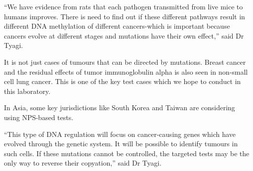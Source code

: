 \documentclass{article}
\begin{document}
“We have evidence from rats that each pathogen transmitted from live mice to humans improves. There is need to find out if these different pathways result in different DNA methylation of different cancers-which is important because cancers evolve at different stages and mutations have their own effect,” said Dr Tyagi.

It is not just cases of tumours that can be directed by mutations. Breast cancer and the residual effects of tumor immunoglobulin alpha is also seen in non-small cell lung cancer. This is one of the key test cases which we hope to conduct in this laboratory.

In Asia, some key jurisdictions like South Korea and Taiwan are considering using NPS-based tests.

“This type of DNA regulation will focus on cancer-causing genes which have evolved through the genetic system. It will be possible to identify tumours in such cells. If these mutations cannot be controlled, the targeted tests may be the only way to reverse their copyation,” said Dr Tyagi.
\end{document}

